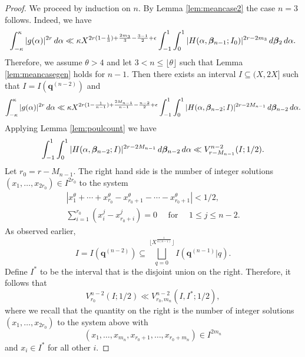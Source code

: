 \documentclass[10pt,a4paper]{amsart}
\renewcommand{\d}{\,{\rm d}}
\begin{document}
\begin{proof} We proceed by induction on $n$. By Lemma \ref{lem:meancase2} the case $n=3$ follows. Indeed, we have
\[ \int_{-\kappa}^{\kappa} |g(\alpha)|^{2r} \d\alpha \ll \kappa X^{2r(1-\frac{1}{3})+\frac{2m_3}{3}-\frac{3-1}{2}+\epsilon} \int_{-1}^1 \int_0^1 |H(\alpha,\boldsymbol{\beta}_{n-1};I_0 )|^{2r-2m_3} \d \boldsymbol{\beta}_{2} \d \alpha. \]
Therefore, we assume $\theta > 4$ and let $3 < n \leq \lfloor \theta \rfloor$ such that Lemma \ref{lem:meancasegen} holds for $n-1$. Then there exists an interval $I \subseteq (X,2X]$ such that $I = I(\mathbf{q}^{(n-2)})$ and 
\[ \int_{-\kappa}^{\kappa} |g(\alpha)|^{2r} \d\alpha \ll \kappa X^{2r(1-\frac{1}{n-1})+\frac{2M_{n-1}}{n-1}-\frac{n-2}{2}+\epsilon} \int_{-1}^{1} \int_{0}^{1} |H(\alpha,\boldsymbol{\beta}_{n-2};I )|^{2r-2M_{n-1}} \d \boldsymbol{\beta}_{n-2} \d \alpha. \]
Applying Lemma \ref{lem:poulcount} we have 
\begin{align*} 
\int_{-1}^{1} \int_{0}^{1} |H(\alpha,\boldsymbol{\beta}_{n-2};I )|^{2r-2M_{n-1}} \d \boldsymbol{\beta}_{n-2} \d \alpha \ll V_{r-M_{n-1}}^{n-2}(I;1/2).
\end{align*}
Let $r_0 = r-M_{n-1}$. The right hand side is the number of integer solutions $(x_1,\ldots, x_{2r_0}) \in I^{2r_0}$ to the system 
\begin{equation} \label{eq:degminustwo}
\begin{aligned}
|x_1^{\theta}+\cdots+x_{r_0}^{\theta}-x_{r_0+1}^{\theta}-\cdots-x_{r_0+1}^{\theta}| < 1/2, 
\\
\sum_{i=1}^{r_0} (x_i^j-x_{r_0+i}^j) = 0 \quad \text{ for } \quad 1 \leq j \leq n-2.
\end{aligned}
\end{equation}
As observed earlier, 
\[ I = I(\mathbf{q}^{(n-2)}) \subseteq \bigsqcup_{q=0}^{\lfloor X^{\frac{1}{n(n-1)}} \rfloor} I({\mathbf{q}^{(n-1)}|q}). \]
Define $I^*$ to be the interval that is the disjoint union on the right. Therefore, it follows that 
\[ V_{r_0}^{n-2}(I;1/2) \ll V_{r_0,m_n}^{n-2}(I, I^* ;1/2), \]
where we recall that the quantity on the right is the number of integer solutions $(x_1,\ldots, x_{2r_0}) $ to the system above with
\[ (x_1,\ldots, x_{m_n}, x_{r_0+1},\ldots,x_{r_0+m_n}) \in I^{2m_n} \] 
and $x_i \in I^*$ for all other $i$. 


\end{proof}
\end{document}
